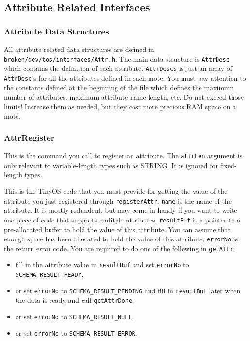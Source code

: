 \documentclass[11pt]{article}
\newcommand{\docroot}{broken/dev}
\begin{document}
\subsection{Attribute Related Interfaces}

\subsubsection{Attribute Data Structures}

All attribute related data structures are defined in
{\tt \docroot/tos/interfaces/Attr.h}.  The main data
structure is {\tt AttrDesc} which contains the definition
of each attribute.  {\tt AttrDescs} is just an array of
{\tt AttrDesc}'s for all the attributes defined in each mote.
You must pay attention to the constants defined at the beginning of the
file which defines the maximum number of attributes, maximum
attribute name length, etc.  Do not exceed those limits!  Increase
them as needed, but they cost more precious RAM space on a mote.

\subsubsection{AttrRegister}


This is the command you call to register an attribute.  The {\tt attrLen} 
argument is only relevant to variable-length types such as STRING.
It is ignored for fixed-length types.



This is the TinyOS code that you must provide for getting the value of the
attribute you just registered through {\tt registerAttr}.  {\tt name} is 
the name of the attribute.  It is mostly redundent, but may come in handy
if you want to write one piece of code that supports mulitple attributes.
{\tt resultBuf} is a pointer to a pre-allocated buffer to hold the
value of this attribute.  You can assume
that enough space has been allocated to hold the value of this
attribute.  {\tt errorNo} is the return error code.  You are required
to do one of the following in {\tt getAttr}:
\begin{itemize}
\item fill in the attribute value in {\tt resultBuf} and set
{\tt *errorNo} to {\tt SCHEMA\_RESULT\_READY},
\item or set {\tt *errorNo} to
{\tt SCHEMA\_RESULT\_PENDING} and fill in {\tt resultBuf} later when the
data is ready and call {\tt getAttrDone},
\item or set {\tt *errorNo} to {\tt SCHEMA\_RESULT\_NULL},
\item or set {\tt *errorNo} to {\tt SCHEMA\_RESULT\_ERROR}.
\end{itemize}
\end{document}
